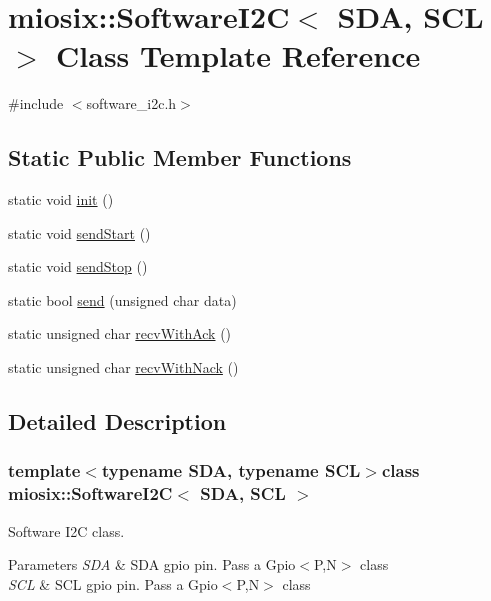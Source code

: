 \hypertarget{classmiosix_1_1_software_i2_c}{\section{miosix\-:\-:Software\-I2\-C$<$ S\-D\-A, S\-C\-L $>$ Class Template Reference}
\label{classmiosix_1_1_software_i2_c}
}


{\ttfamily \#include $<$software\-\_\-i2c.\-h$>$}

\subsection*{Static Public Member Functions}
\begin{DoxyCompactItemize}
\item 
static void \hyperlink{classmiosix_1_1_software_i2_c_affca2c005e549cf0d244064d69808313}{init} ()
\item 
static void \hyperlink{classmiosix_1_1_software_i2_c_abcbeb09130637bce45c8827e8098a5ff}{send\-Start} ()
\item 
static void \hyperlink{classmiosix_1_1_software_i2_c_a66a312f667a52046e45035588caff0b4}{send\-Stop} ()
\item 
static bool \hyperlink{classmiosix_1_1_software_i2_c_a6e0535020ec3adf027a4ac77481e6e01}{send} (unsigned char data)
\item 
static unsigned char \hyperlink{classmiosix_1_1_software_i2_c_ad16eb98c9e1089e21571d1f7c552a151}{recv\-With\-Ack} ()
\item 
static unsigned char \hyperlink{classmiosix_1_1_software_i2_c_a48d8aeebedba01e3dc11866710b873fb}{recv\-With\-Nack} ()
\end{DoxyCompactItemize}


\subsection{Detailed Description}
\subsubsection*{template$<$typename S\-D\-A, typename S\-C\-L$>$class miosix\-::\-Software\-I2\-C$<$ S\-D\-A, S\-C\-L $>$}

Software I2\-C class. 
\begin{DoxyParams}{Parameters}
{\em S\-D\-A} & S\-D\-A gpio pin. Pass a Gpio$<$\-P,\-N$>$ class \\
\hline
{\em S\-C\-L} & S\-C\-L gpio pin. Pass a Gpio$<$\-P,\-N$>$ class \\
\hline
\end{DoxyParams}



